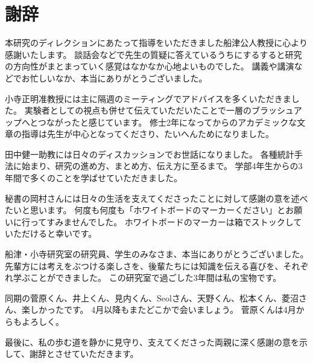 \chapter*{謝辞}
本研究のディレクションにあたって指導をいただきました船津公人教授に心より感謝いたします。
談話会などで先生の質疑に答えているうちにするすると研究の方向性がまとまっていく感覚はなかなか心地よいものでした。
講義や講演などでお忙しいなか、本当にありがとうございました。

小寺正明准教授には主に隔週のミーティングでアドバイスを多くいただきました。
実験者としての視点も併せて伝えていただいたことで一層のブラッシュアップへとつながったと感じています。
修士2年になってからのアカデミックな文章の指導は先生が中心となってくださり、たいへんためになりました。

田中健一助教には日々のディスカッションでお世話になりました。
各種統計手法に始まり、研究の進め方、まとめ方、伝え方に至るまで。
学部4年生からの3年間で多くのことを学ばせていただきました。

秘書の岡村さんには日々の生活を支えてくださったことに対して感謝の意を述べたいと思います。
何度も何度も「ホワイトボードのマーカーください」とお願いに行ってすみませんでした。
ホワイトボードのマーカーは箱でストックしていただけると幸いです。

船津・小寺研究室の研究員、学生のみなさま、本当にありがとうございました。
先輩方には考えをぶつける楽しさを、後輩たちには知識を伝える喜びを、それぞれ学ぶことができました。
この研究室で過ごした3年間は私の宝物です。

同期の菅原くん、井上くん、見内くん、Seolさん、天野くん、松本くん、菱沼さん、楽しかったです。
4月以降もまたどこかで会いましょう。
菅原くんは4月からもよろしく。

最後に、私の歩む道を静かに見守り、支えてくださった両親に深く感謝の意を示して、謝辞とさせていただきます。
